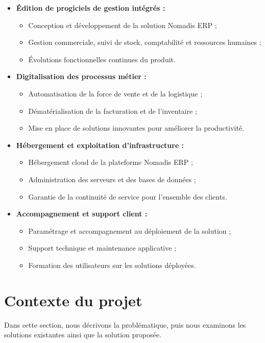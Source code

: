 \begin{itemize}[label=]
\item \textbf{Édition de progiciels de gestion intégrés :}
\begin{itemize}[label=]
    \item Conception et développement de la solution Nomadis ERP ;
    \item Gestion commerciale, suivi de stock, comptabilité et ressources humaines ;
    \item Évolutions fonctionnelles continues du produit.
\end{itemize}

\item \textbf{Digitalisation des processus métier :}
\begin{itemize}[label=]
    \item Automatisation de la force de vente et de la logistique ;
    \item Dématérialisation de la facturation et de l'inventaire ;
    \item Mise en place de solutions innovantes pour améliorer la productivité.
\end{itemize}

\item \textbf{Hébergement et exploitation d'infrastructure :}
\begin{itemize}[label=]
    \item Hébergement cloud de la plateforme Nomadis ERP ;
    \item Administration des serveurs et des bases de données ;
    \item Garantie de la continuité de service pour l'ensemble des clients.
\end{itemize}

\item \textbf{Accompagnement et support client :}
\begin{itemize}[label=]
    \item Paramétrage et accompagnement au déploiement de la solution ;
    \item Support technique et maintenance applicative ;
    \item Formation des utilisateurs sur les solutions déployées.
\end{itemize}
\end{itemize}

\section{Contexte du projet}
Dans cette section, nous décrivons la problématique, puis nous examinons les solutions
existantes ainsi que la solution proposée.

